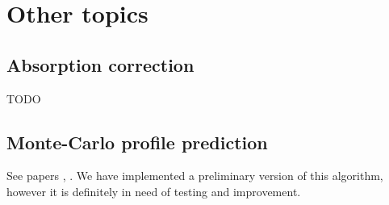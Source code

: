 \documentclass[twocolumn,preprintnumbers,amsmath,amssymb]{revtex4}
\begin{document}
\section{Other topics}
\subsection{Absorption correction}
TODO

\subsection{Monte-Carlo profile prediction}
See papers \cite{eval-14}, \cite{eval-15}. We have implemented a preliminary version of this algorithm,
however it is definitely in need of testing and improvement.

\nocite{*}


\end{document}
